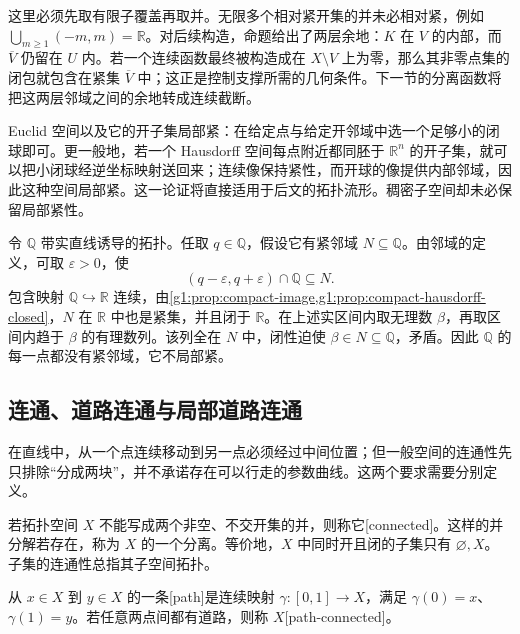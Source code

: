 这里必须先取有限子覆盖再取并。无限多个相对紧开集的并未必相对紧，例如 \(\bigcup_{m\ge1}(-m,m)=\mathbb R\)。对后续构造，命题给出了两层余地：\(K\) 在 \(V\) 的内部，而 \(\overline V\) 仍留在 \(U\) 内。若一个连续函数最终被构造成在 \(X\setminus V\) 上为零，那么其非零点集的闭包就包含在紧集 \(\overline V\) 中；这正是控制支撑所需的几何条件。下一节的分离函数将把这两层邻域之间的余地转成连续截断。

\ProseParagraphBreak

Euclid 空间以及它的开子集局部紧：在给定点与给定开邻域中选一个足够小的闭球即可。更一般地，若一个 Hausdorff 空间每点附近都同胚于 \(\mathbb R^n\) 的开子集，就可以把小闭球经逆坐标映射送回来；连续像保持紧性，而开球的像提供内部邻域，因此这种空间局部紧。这一论证将直接适用于后文的拓扑流形。稠密子空间却未必保留局部紧性。

\begin{example}\label{g1:exm:rationals-not-locally-compact}
	令 \(\mathbb Q\) 带实直线诱导的拓扑。任取 \(q\in\mathbb Q\)，假设它有紧邻域 \(N\subseteq\mathbb Q\)。由邻域的定义，可取 \(\varepsilon>0\)，使
	\[
		(q-\varepsilon,q+\varepsilon)\cap\mathbb Q\subseteq N.
	\]
	包含映射 \(\mathbb Q\hookrightarrow\mathbb R\) 连续，由\cref{g1:prop:compact-image,g1:prop:compact-hausdorff-closed}，\(N\) 在 \(\mathbb R\) 中也是紧集，并且闭于 \(\mathbb R\)。在上述实区间内取无理数 \(\beta\)，再取区间内趋于 \(\beta\) 的有理数列。该列全在 \(N\) 中，闭性迫使 \(\beta\in N\subseteq\mathbb Q\)，矛盾。因此 \(\mathbb Q\) 的每一点都没有紧邻域，它不局部紧。
\end{example}

\subsection{连通、道路连通与局部道路连通}
\label{g1:subsec:0402:03}

在直线中，从一个点连续移动到另一点必须经过中间位置；但一般空间的连通性先只排除“分成两块”，并不承诺存在可以行走的参数曲线。这两个要求需要分别定义。

\begin{definition}\label{g1:def:connected-path-connected}
	若拓扑空间 \(X\) 不能写成两个非空、不交开集的并，则称它[connected]。这样的并分解若存在，称为 \(X\) 的一个分离。等价地，\(X\) 中同时开且闭的子集只有 \(\varnothing,X\)。子集的连通性总指其子空间拓扑。

	从 \(x\in X\) 到 \(y\in X\) 的一条[path]是连续映射 \(\gamma:[0,1]\to X\)，满足 \(\gamma(0)=x\)、\(\gamma(1)=y\)。若任意两点间都有道路，则称 \(X\)[path-connected]。
\end{definition}

